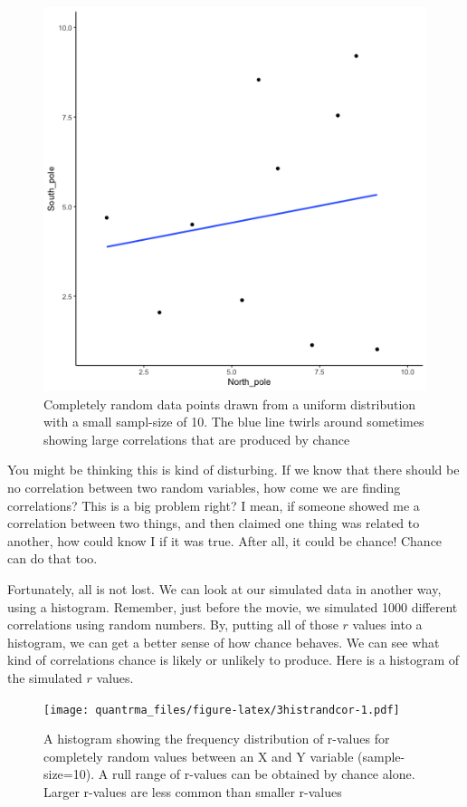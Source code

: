 \documentclass[
]{book}
\begin{document}
\begin{figure}
\centering
\includegraphics{gifs/corUnifn10-1.gif}
\caption{\label{fig:3randcor10gif}Completely random data points drawn from a uniform distribution with a small sampl-size of 10. The blue line twirls around sometimes showing large correlations that are produced by chance}
\end{figure}

You might be thinking this is kind of disturbing. If we know that there should be no correlation between two random variables, how come we are finding correlations? This is a big problem right? I mean, if someone showed me a correlation between two things, and then claimed one thing was related to another, how could know I if it was true. After all, it could be chance! Chance can do that too.

Fortunately, all is not lost. We can look at our simulated data in another way, using a histogram. Remember, just before the movie, we simulated 1000 different correlations using random numbers. By, putting all of those \(r\) values into a histogram, we can get a better sense of how chance behaves. We can see what kind of correlations chance is likely or unlikely to produce. Here is a histogram of the simulated \(r\) values.

\begin{figure}
\centering
\texttt{[image: quantrma\_files/figure-latex/3histrandcor-1.pdf]}
\caption{\label{fig:3histrandcor}A histogram showing the frequency distribution of r-values for completely random values between an X and Y variable (sample-size=10). A rull range of r-values can be obtained by chance alone. Larger r-values are less common than smaller r-values}
\end{figure}
\end{document}
